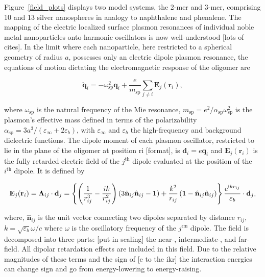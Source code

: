 \documentclass[journal=apchd5,manuscript=article]{achemso}
\begin{document}
Figure~\ref{field_plots} displays two model systems, the 2-mer and 3-mer, comprising 10 and 13 silver nanospheres in analogy to naphthalene and phenalene. The mapping of the electric localized surface plasmon resonances of individual noble metal nanoparticles onto harmonic oscillators is now well-understood [lots of cites]. In the limit where each nanoparticle, here restricted to a spherical geometry of radius $a$, possesses only an electric dipole plasmon resonance, the equations of motion dictating the electromagnetic response of the oligomer are

\begin{equation}
\ddot{\textbf{q}}_i = -\omega_{\textrm{sp}}^2\textbf{q}_i + \frac{e}{m_{\textrm{sp}}}\sum_{j\neq i}\textbf{E}_j(\textbf{r}_i),
\label{equation_of_motion}
\end{equation}

\noindent where $\omega_{\textrm{sp}}$ is the natural frequency of the Mie resonance, $m_{\textrm{sp}} = e^2/\alpha_{\textrm{sp}}\omega_{\textrm{sp}}^2$ is the plasmon's effective mass defined in terms of the polarizability $\alpha_{\textrm{sp}} = 3a^3/(\varepsilon_{\infty} + 2\varepsilon_b)$, with $\varepsilon_{\infty}$ and $\varepsilon_b$ the high-frequency and background dielectric functions. The dipole moment of each plasmon oscillator, restricted to lie in the plane of the oligomer at position ri [format], is $\textbf{d}_i = e\textbf{q}_i$ and $\textbf{E}_j(\textbf{r}_i)$ is the fully retarded electric field of the $j^{\textrm{th}}$ dipole evaluated at the position of the $i^{\textrm{th}}$ dipole. It is defined by

\begin{equation}
\textbf{E}_j(\textbf{r}_i) = \boldsymbol{\Lambda}_{ij}\cdot\textbf{d}_j\\
= \left\{\left(\frac{1}{r_{ij}^3} - \frac{ik}{r_{ij}^2}\right)\left(3\hat{\textbf{n}}_{ij}\hat{\textbf{n}}_{ij} - \textbf{1}\right) + \frac{k^2}{r_{ij}}\left(\textbf{1}-\hat{\textbf{n}}_{ij}\hat{\textbf{n}}_{ij}\right)\right\}\frac{e^{\textrm{i}kr_{ij}}}{\varepsilon_b}\cdot\textbf{d}_j,
\label{electric_field_lambda}
\end{equation}

\noindent where, $\hat{\textbf{n}}_{ij}$ is the unit vector connecting two dipoles separated by distance $r_{ij}$, $k=\sqrt{\varepsilon_b}\omega/c$ where $\omega$ is the oscillatory frequency of the $j^{\textrm{rm}}$ dipole. The field is decomposed into three parts: [put in scaling] the near-, intermediate-, and far-field. All dipolar retardation effects are included in this field\cite{Purcell1973}. Due to the relative magnitudes of these terms and the sign of [e to the ikr] the interaction energies can change sign and go from energy-lowering to energy-raising.
\end{document}
